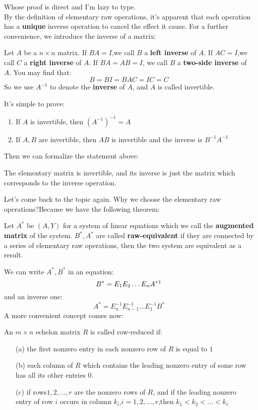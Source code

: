 \documentclass{article}
\begin{document}
Whose proof is direct and I'm lazy to type.\\
\indent By the definition of elementary raw operations, it's apparent that each operation has a \textbf{unique} inverse operation to cancel the effect it cause. 
\indent For a further convenience, we introduce the inverse of a matrix:
\begin{dde}
	Let $A$ be a $n\times n$ matrix. If $BA=I$,we call $B$ a \textbf{left inverse} of $A$. If $AC=I$,we call $C$ a \textbf{right inverse} of $A$. If $BA=AB=I$, we call $B$ a \textbf{two-side inverse} of $A$. You may find that:\[B=BI=BAC=IC=C\]So we use $A^{-1}$ to denote the \textbf{inverse} of $A$, and $A$ is called invertible.
\end{dde}
It's simple to prove:
\begin{thm}
\begin{enumerate}
	\item If $A$ is invertible, then $(A^{-1})^{-1}=A$
	\item If $A,B$ are invertible, then $AB$ is invertible and the inverse is $B^{-1}A^{-1}$ 
\end{enumerate}
\end{thm}
Then we can formalize the statement above:
\begin{thm}
	The elementary matrix is invertible, and its inverse is just the matrix which corresponds to the inverse operation.
\end{thm}
Let's come back to the topic again. Why we choose the elementary raw operations?Because we have the following theorem:
\begin{thm}
	Let $A^*$ be $(A,Y)$ for a system of linear equations which we call the \textbf{augmented matrix} of the system. $B^*,A^*$ are called \textbf{raw-equivalent} if they are connected by a series of elementary raw operations, then the two system are equivalent as a result.
\end{thm}
We can write $A^*,B^*$ in an equation:\[B^*=E_1E_2\dots E_nA^*\footnote{the foot scripts here don't mean the dimension}\]
and an inverse one:\[A^*=E_n^{-1}E_{n-1}^{-1}\dots E_1^{-1}B^*\]
\indent A more convenient concept comes now:
\begin{dde}
	An $m\times n$ echelon matrix $R$ is called row-reduced if:
	\begin{enumerate}
		\item[(a)] the first nonzero entry in each nonzero row of $R$ is equal to $1$
		\item[(b)] each column of $R$ which contains the leading nonzero entry of some row has all its other entries $0$.
		\item[(c)] if rows$1,2,\dots,r$ are the nonzero rows of $R$, and if the leading nonzero entry of row $i$ occurs in column $k_i$,$i=1,2,\dots,r$,then $k_1<k_2<\dots<k_r$
	\end{enumerate}
\end{dde}
\end{document}
